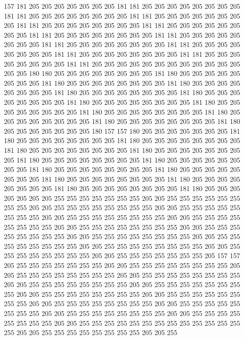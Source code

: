 157 181 205 205 205 205 205 205 205 181 181 205 205 205 205 205 205 205 205 181
181 205 205 205 205 205 205 205 205 181 181 205 205 205 205 205 205 205 205 181
181 205 205 205 205 205 205 205 205 181 181 205 205 205 205 205 205 205 205 181
181 205 205 205 205 205 205 205 205 181 181 205 205 205 205 205 205 205 205 181
181 205 205 205 205 205 205 205 205 181 181 205 205 205 205 205 205 205 205 181
181 205 205 205 205 205 205 205 205 181 181 205 205 205 205 205 205 205 205 181
181 205 205 205 205 205 205 205 205 205 205 205 205 205 205 180 180 205 205 205
205 205 205 205 205 181 180 205 205 205 205 205 205 205 205 181 180 205 205 205
205 205 205 205 205 181 180 205 205 205 205 205 205 205 205 181 180 205 205 205
205 205 205 205 205 181 180 205 205 205 205 205 205 205 205 181 180 205 205 205
205 205 205 205 205 181 180 205 205 205 205 205 205 205 205 181 180 205 205 205
205 205 205 205 205 181 180 205 205 205 205 205 205 205 205 181 180 205 205 205
205 205 205 205 205 181 180 205 205 205 205 205 205 205 180 157 157 180 205 205
205 205 205 205 205 181 180 205 205 205 205 205 205 205 205 181 180 205 205 205
205 205 205 205 205 181 180 205 205 205 205 205 205 205 205 181 180 205 205 205
205 205 205 205 205 181 180 205 205 205 205 205 205 205 205 181 180 205 205 205
205 205 205 205 205 181 180 205 205 205 205 205 205 205 205 181 180 205 205 205
205 205 205 205 205 181 180 205 205 205 205 205 205 205 205 181 180 205 205 205
205 205 205 205 205 181 180 205 205 205 205 205 205 205 205 181 180 205 205 205
205 205 205 205 255 255 255 255 255 255 255 205 205 255 255 255 255 255 255 255
255 205 205 255 255 255 255 255 255 255 255 205 205 255 255 255 255 255 255 255
255 205 205 255 255 255 255 255 255 255 255 205 205 255 255 255 255 255 255 255
255 205 205 255 255 255 255 255 255 255 255 205 205 255 255 255 255 255 255 255
255 205 205 255 255 255 255 255 255 255 255 205 205 255 255 255 255 255 255 255
255 205 205 255 255 255 255 255 255 255 255 205 205 255 255 255 255 255 255 255
255 205 205 255 255 255 255 255 255 255 205 157 157 205 255 255 255 255 255 255
255 205 205 255 255 255 255 255 255 255 255 205 205 255 255 255 255 255 255 255
255 205 205 255 255 255 255 255 255 255 255 205 205 255 255 255 255 255 255 255
255 205 205 255 255 255 255 255 255 255 255 205 205 255 255 255 255 255 255 255
255 205 205 255 255 255 255 255 255 255 255 205 205 255 255 255 255 255 255 255
255 205 205 255 255 255 255 255 255 255 255 205 205 255 255 255 255 255 255 255
255 205 205 255 255 255 255 255 255 255 255 205 205 255 255 255 255 255 255 255
255 255 255 255 255 255 255 205 205 255 255 255 255 255 255 255 255 205 205 255

